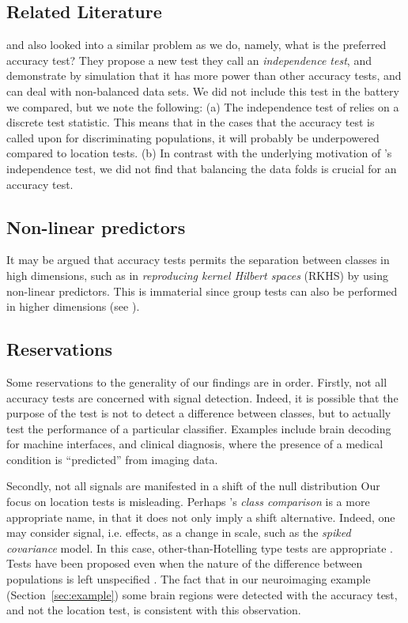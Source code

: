\documentclass[12pt,a4paper]{article}
\begin{document}
\subsection{Related Literature}
\cite{olivetti_induction_2012} and \cite{olivetti_statistical_2014} also looked into a similar problem as we do, namely, what is the preferred accuracy test?
They propose a new test they call an \emph{independence test}, and demonstrate by simulation that it has more power than other accuracy tests, and can deal with non-balanced data sets. 
We did not include this test in the battery we compared, but we note the following: 
(a) The independence test of \cite{olivetti_induction_2012} relies on a discrete test statistic. This means that in the cases that the accuracy test is called upon for discriminating populations, it will probably be underpowered compared to location tests. 
(b) In contrast with the underlying motivation of \cite{olivetti_induction_2012}'s independence test, we did not find that balancing the data folds is crucial for an accuracy test. 



\subsection{Non-linear predictors}
It may be argued that accuracy tests permits the separation between classes in high dimensions, such as in \emph{reproducing kernel Hilbert spaces} (RKHS) by using non-linear predictors.
This is immaterial since group tests can also be performed in higher dimensions (see \cite{gretton_kernel_2012-1}).


\subsection{Reservations}
\label{sec:reservations}

Some reservations to the generality of our findings are in order. 
Firstly, not all accuracy tests are concerned with signal detection.
Indeed, it is possible that the purpose of the test is not to detect a difference between classes, but to actually test the performance of a particular classifier. 
Examples include brain decoding for machine interfaces, and clinical diagnosis, where the presence of a medical condition is ``predicted'' from imaging data. \citep[e.g.][]{olivetti_induction_2012,wager_fmri-based_2013}

Secondly, not all signals are manifested in a shift of the null distribution 
Our focus on location tests is misleading. Perhaps \cite{simon_pitfalls_2003}'s \emph{class comparison} is a more appropriate name, in that it does not only imply a shift alternative. 
Indeed, one may consider signal, i.e. effects, as a change in scale, such as the \emph{spiked covariance} model. In this case, other-than-Hotelling type tests are appropriate \citep[e.g.][]{nadler_finite_2008}.
Tests have been proposed even when the nature of the difference between populations is left unspecified \citep[e.g.][]{gretton_kernel_2012-1}.
The fact that in our neuroimaging example (Section~\ref{sec:example}) some brain regions were detected with the accuracy test, and not the location test, is consistent with this observation. 
\end{document}
